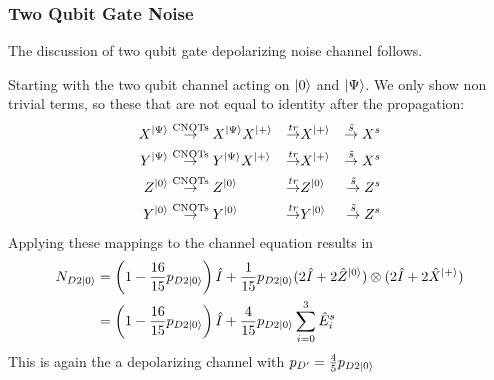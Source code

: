 \subsubsection{Two Qubit Gate Noise}

The discussion of two qubit gate depolarizing noise channel follows. 

Starting with the two qubit channel acting on $\ket{0}$ and $\ket{\Psi}$.
We only show non trivial terms, so these that are not equal to identity after the propagation: 
\begin{align*}
    X^{\ket{\Psi}} 
    &\overset{\text{CNOTs}}{\rightarrow} X^{\ket{\Psi}}  X^{\ket{+}}  
    &\overset{tr}{\rightarrow} & X^{\ket{+}} 
    &\overset{\tilde{s}}{\rightarrow} X^s  \\
    Y^{\ket{\Psi}} 
    &\overset{\text{CNOTs}}{\rightarrow} Y^{\ket{\Psi}}  X^{\ket{+}}  
    &\overset{tr}{\rightarrow} & X^{\ket{+}} 
    &\overset{\tilde{s}}{\rightarrow} X^s  \\
    Z^{\ket{0}}  
    &\overset{\text{CNOTs}}{\rightarrow} Z^{\ket{0}} 
    &\overset{tr}{\rightarrow} & Z^{\ket{0}}   
    &\overset{\tilde{s}}{\rightarrow} Z^s  \\
    Y^{\ket{0}}  
    &\overset{\text{CNOTs}}{\rightarrow} Y^{\ket{0}} 
    &\overset{tr}{\rightarrow} & Y^{\ket{0}}   
    &\overset{\tilde{s}}{\rightarrow} Z^s  \\
\end{align*} 
Applying these mappings to the channel equation results in  
\begin{align*}
    N_{D2\ket{0}} &= \left(1- \frac{16}{15} p_{D2\ket{0}} \right) \hat{I} + \frac{1}{15} p_{D2\ket{0}}(2\hat{I} + 2\hat{Z}^{\ket{0}}) \otimes (2\hat{I} + 2\hat{X}^{\ket{+}})\\
    &= \left(1- \frac{16}{15} p_{D2\ket{0}} \right) \hat{I} + \frac{4}{15}p_{D2\ket{0}} \sum_{i=0}^{3} \hat{E}_i^s 
\end{align*}
This is again the a depolarizing channel with $p_{D'} = \frac{4}{5} p_{D2\ket{0}}$


